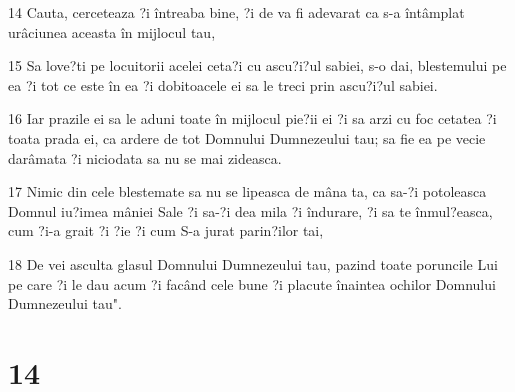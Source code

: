 \par 14 Cauta, cerceteaza ?i întreaba bine, ?i de va fi adevarat ca s-a întâmplat urâciunea aceasta în mijlocul tau,
\par 15 Sa love?ti pe locuitorii acelei ceta?i cu ascu?i?ul sabiei, s-o dai, blestemului pe ea ?i tot ce este în ea ?i dobitoacele ei sa le treci prin ascu?i?ul sabiei.
\par 16 Iar prazile ei sa le aduni toate în mijlocul pie?ii ei ?i sa arzi cu foc cetatea ?i toata prada ei, ca ardere de tot Domnului Dumnezeului tau; sa fie ea pe vecie darâmata ?i niciodata sa nu se mai zideasca.
\par 17 Nimic din cele blestemate sa nu se lipeasca de mâna ta, ca sa-?i potoleasca Domnul iu?imea mâniei Sale ?i sa-?i dea mila ?i îndurare, ?i sa te înmul?easca, cum ?i-a grait ?i ?ie ?i cum S-a jurat parin?ilor tai,
\par 18 De vei asculta glasul Domnului Dumnezeului tau, pazind toate poruncile Lui pe care ?i le dau acum ?i facând cele bune ?i placute înaintea ochilor Domnului Dumnezeului tau".

\chapter{14}

